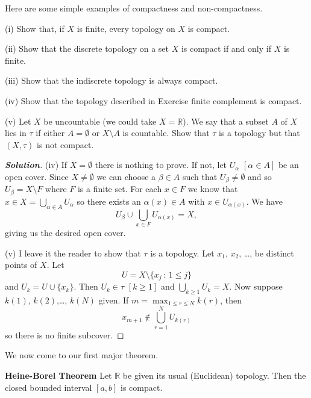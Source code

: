 Here are some simple examples of compactness and non-compactness.

\begin{theorem}\label{T;simple compact examples}
(i) Show that, if $X$ is finite, every
topology on $X$ is compact.

(ii) Show that the discrete topology on a set $X$ is
compact if and only if $X$ is finite.

(iii) Show that the indiscrete topology is always compact.

(iv) Show that the topology described in
Exercise finite complement is compact.

(v) Let $X$ be uncountable (we could take
$X={\mathbb R}$).
We say that a subset $A$ of $X$ lies in $\tau$ if
either $A=\emptyset$ or $X\setminus A$ is countable.
Show that $\tau$ is a topology
but that $(X,\tau)$
is not compact.
\end{theorem}

\begin{proof}[\bf Solution]
(iv) If $X=\emptyset$ there is nothing to prove.
If not, let $U_{\alpha}$ $[\alpha\in A]$ be an open cover.
Since $X\neq\emptyset$ we can choose a $\beta\in A$
such that $U_{\beta}\neq\emptyset$ and so
$U_{\beta}=X\setminus F$ where $F$ is a finite set.
For each $x\in F$ we know that $x\in X=\bigcup_{\alpha\in A}U_{\alpha}$
so there exists an $\alpha(x)\in A$ with $x\in U_{\alpha(x)}$.
We have
\[U_{\beta}\cup\bigcup_{x\in F}U_{\alpha(x)}=X,\]
giving us the desired open cover.

(v) I leave it the reader to show that $\tau$ is a topology.
Let $x_{1}$, $x_{2}$, \dots, be distinct points of $X$.
Let
\[U=X\setminus\{x_{j}\,:\,1\leq j\}\]
and $U_{k}=U\cup\{x_{k}\}$. Then $U_{k}\in\tau$ $[k\geq 1]$
and $\bigcup_{k\geq 1}U_{k}=X$.
Now suppose $k(1)$, $k(2)$,\dots, $k(N)$ given.
If $m=\max_{1\leq r\leq N}k(r)$, then
\[x_{m+1}\notin\bigcup_{r=1}^{N}U_{k(r)}\]
so there is no finite subcover.
\end{proof}

We now come to our first major theorem.


\begin{theorem}\label{T;Heine-Borel}
{\bf Heine-Borel Theorem}
Let ${\mathbb R}$ be given its usual (Euclidean) topology. Then the closed bounded interval $[a,b]$ is compact.
\end{theorem}

